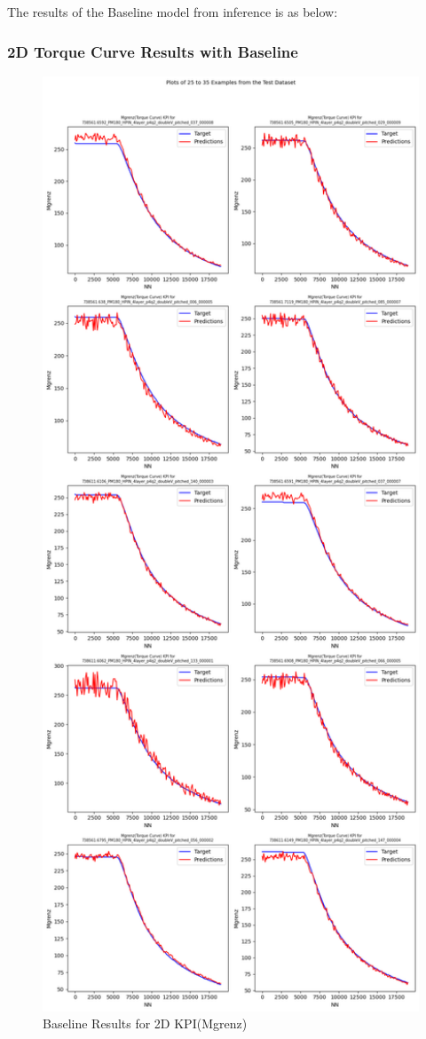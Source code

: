 \documentclass{report} %
\begin{document}
The results of the Baseline model from inference is as below: \\

\subsubsection*{2D Torque Curve Results with Baseline}

\begin{figure}[H]
    \centering
    \includegraphics[width=1\textwidth]{./ReportImages/KPI2D_predictions.png} 
    \caption{Baseline Results for 2D KPI(Mgrenz)} 
    \label{fig:MLP Training Results for 2D KPI(Mgrenz)}
\end{figure}
\end{document}
